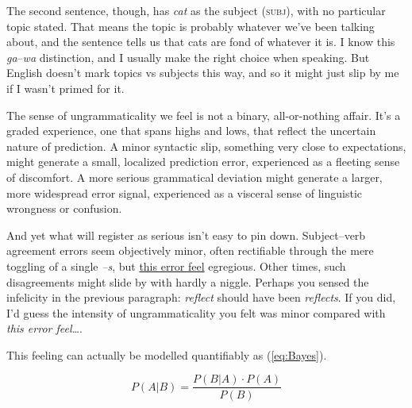 \ea\label{ex:fond-of-cats}
    \z
\z

The second sentence, though, has \textit{cat} as the subject (\textsc{subj}), with no particular topic stated. That means the topic is probably whatever we've been talking about, and the sentence tells us that cats are fond of whatever it is. I know this \textit{ga}--\textit{wa} distinction, and I usually make the right choice when speaking. But English doesn't mark topics vs subjects this way, and so it might just slip by me if I wasn't primed for it.

\bigskip

The sense of ungrammaticality we feel is not a binary, all-or-nothing affair. It's a graded experience, one that spans highs and lows, that reflect the uncertain nature of prediction. A minor syntactic slip, something very close to expectations, might generate a small, localized prediction error, experienced as a fleeting sense of discomfort. A more serious grammatical deviation might generate a larger, more widespread error signal, experienced as a visceral sense of linguistic wrongness or confusion.

And yet what will register as serious isn't easy to pin down. Subject--verb agreement errors seem objectively minor, often rectifiable through the mere toggling of a single \textit{--s}, but \uline{this error feel} egregious. Other times, such disagreements might slide by with hardly a niggle. Perhaps you sensed the infelicity in the previous paragraph: \textit{reflect} should have been \textit{reflects}. If you did, I'd guess the intensity of ungrammaticality you felt was minor compared with \textit{this error feel\dots}.

This feeling can actually be modelled quantifiably as (\ref{eq:Bayes}).

\begin{equation} \label{eq:Bayes}
P(A|B) = \frac{P(B|A) \cdot P(A)}{P(B)}
\end{equation}

